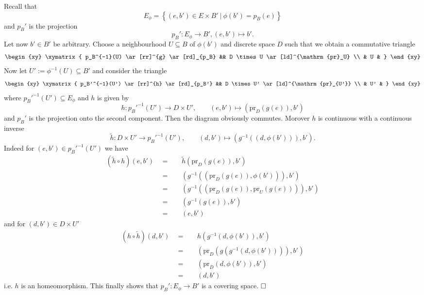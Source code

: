 \documentclass[11pt]{book}
\numberwithin{dummy}{section}
\theoremstyle{nonumberbreak}
\newenvironment{sol}[1][]{\ifthenelse{\equal{#1}{}}{\solution}{\solution[#1]}\rm}{\endsolution}
\newenvironment{prob}[1][]{\ifthenelse{\equal{#1}{}}{\problem}{\problem[#1]}\rm}{\endproblem}
\newcommand{\la}{\longrightarrow}
\begin{document}
\begin{spacing}{1.4}
\begin{prob}
\begin{sol}
Recall that 
$$E_{\phi} = \left\{ (e,b') \in E \times B' \ \vert \ \phi(b') = p_B(e) \right\}$$
and $p_B'$ is the projection $$p_B': E_{\phi} \la B', (e,b') \mapsto b'.$$
Let now $b' \in B'$ be arbitrary. Choose a neighbourhood $U \subseteq B$ of $\phi(b')$ and discrete space $D$ such that we obtain a commutative triangle
$$
\begin{xy}
\xymatrix{
p_B^{-1}(U) \ar[rr]^{g} \ar[rd]_{p_B} && D \times U \ar[ld]^{\mathrm{pr}_U} \\ & U & 
}
\end{xy}
$$
Now let $U':= \phi^{-1}(U) \subseteq B'$ and consider the triangle
$$
\begin{xy}
\xymatrix{
p_B'^{-1}(U') \ar[rr]^{h} \ar[rd]_{p_B'} && D \times U' \ar[ld]^{\mathrm{pr}_{U'}} \\ & U' & 
}
\end{xy}
$$
where
$p_B'^{-1}(U')  \subseteq E_{\phi}$ and $h$ is given by
$$h: p_B'^{-1}(U') \la D \times U', \qquad (e,b') \mapsto (\mathrm{pr}_D(g(e)), b')$$
and $p_B'$ is the projection onto the second component. Then the diagram obviously commutes. Morover $h$ is continuous with a continuous inverse 
$$\tilde{h}: D \times U' \la p_B'^{-1}(U'), \qquad (d,b') \mapsto \left( g^{-1}\left((d,\phi(b'))\right), b'\right).$$
Indeed for $(e,b') \in p_B'^{-1}(U')$ we have 
\begin{alignat*}{5}
(\tilde{h} \circ h)(e,b') \ \ &=&& \ \  \tilde{h}\left( \mathrm{pr}_D(g(e)), b'\right) \\
&=&& \ \ \left( g^{-1}\left((\mathrm{pr}_D(g(e)), \phi(b'))\right), b'\right) \\
&=&& \ \ \left( g^{-1}\left((\mathrm{pr}_D(g(e)), \mathrm{pr}_U(g(e)))\right), b'\right) \\
&=&& \ \ \left( g^{-1}(g(e)), b'\right)\\
&=&& \ \ (e,b')
\end{alignat*}
and for $(d,b') \in D \times U'$
\begin{alignat*}{5}
(h \circ \tilde{h})(d,b') \ \ &=&& \ \ h \left( g^{-1}(d, \phi(b')), b'\right) \\
&=&& \ \ \left( \mathrm{pr}_D\left(g\left( g^{-1}(d, \phi(b'))\right)\right), b'\right) \\
&=&& \ \ \left( \mathrm{pr}_D(d, \phi(b')), b'\right) \\ 
&=&& \ \ (d,b')
\end{alignat*}
i.e. $h$ is an homeomorphism. This finally shows that $p_B': E_{\phi} \la B'$ is a covering space. $\hfill \Box$
\end{sol}


\end{prob}
\end{spacing}
\end{document}

